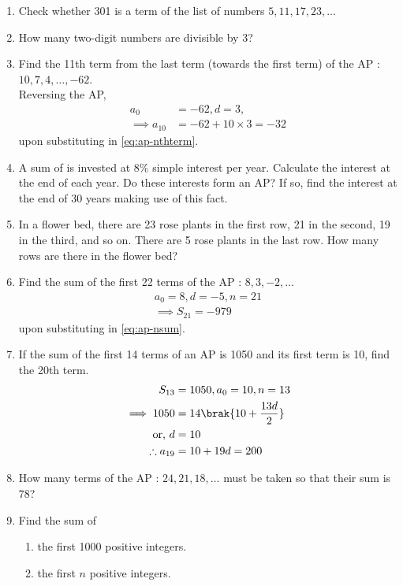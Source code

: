 \begin{enumerate}[label=\thesubsection.\arabic*, ref=\thesubsection.\theenumi]
\item Check whether 301 is a term of the list of numbers $5,  11,  17,  23,  \dots$
\item How many two-digit numbers are divisible by 3?
\item Find the 11th term from the last term (towards the first term) of the
AP : $10,  7,  4,  \dots,  - 62$.
	\\
	\solution Reversing the AP,
\begin{align}
	a_0 &= -62, d = 3, 
	\\
	\implies a_10&=-62+10\times 3 = -32
\end{align}
upon substituting in
	\eqref{eq:ap-nthterm}.
\item A sum of  is invested at $8\%$ simple interest per year. Calculate the interest at the end of each year. Do these interests form an AP? If so,  find the interest at the end of 30 years making use of this fact.
\item In a flower bed,  there are 23 rose plants in the first row,  21 in the
second,  19 in the third,  and so on. There are 5 rose plants in the last row. How many rows are there in the flower bed?
\item Find the sum of the first 22 terms of the AP : $8,  3,  -2,  \dots$
	\\
	\solution
\begin{align}
a_0 = 8, d = -5, n = 21
\\
\implies 
	S_{21} = -979
\end{align}
upon substituting in 
	\eqref{eq:ap-nsum}.
\item If the sum of the first 14 terms of an AP is 1050 and its first term is 10,  find the 20th term.
	\\
	\solution
	\begin{align}
		S_{13} &= 1050, a_0 = 10, n = 13
		\\
		\implies 1050 &= 14\brak{10+\frac{13d}{2}}
		\\
		\text{or, } d&= 10
		\\
		\therefore
		a_{19} &= 10+19d = 200
	\end{align}
\item How many terms of the AP : $24,  21,  18,  \dots$ must be taken so that their
sum is 78?
\item Find the sum of 
\begin{enumerate}
\item the first 1000 positive integers.
\item the first $n$ positive integers.

\end{enumerate}
\end{enumerate}
